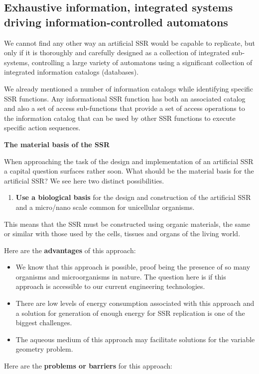 \documentclass[letterpaper]{article}
\begin{document}
\bigskip

\subsection[Exhaustive information, integrated systems driving
information{}-controlled automatons]{Exhaustive information, integrated
systems driving information-controlled automatons}
\hypertarget{RefHeading3122306210128}{}\label{bkm:Ref348984751}We cannot
find any other way an artificial SSR would be capable to replicate, but
only if it is thoroughly and carefully designed as a collection of
integrated sub-systems, controlling a large variety of automatons using
a significant collection of integrated information catalogs
(databases).


\bigskip

We already mentioned a number of information catalogs while identifying
specific SSR functions. Any informational SSR function has both an
associated catalog and also a set of access sub-functions that provide
a set of access operations to the information catalog that can be used
by other SSR functions to execute specific action sequences.


\bigskip

{\bfseries
\hypertarget{RefHeading3124306210128}{}The material basis of the SSR}

When approaching the task of the design and implementation of an
artificial SSR a capital question surfaces rather soon. What should be
the material basis for the artificial SSR? We see here two distinct
possibilities.


\bigskip

\begin{enumerate}
\item \textbf{Use a biological basis} for the design and construction of
the artificial SSR and a micro/nano scale common for unicellular
organisms. 
\end{enumerate}
This means that the SSR must be constructed using organic materials, the
same or similar with those used by the cells, tissues and organs of the
living world.

Here are the \textbf{advantages} of this approach:


\bigskip

\begin{itemize}
\item We know that this approach is possible, proof being the presence
of so many organisms and microorganisms in nature. The question here is
if this approach is accessible to our current engineering technologies.
\item There are low levels of energy consumption associated with this
approach and a solution for generation of enough energy for SSR
replication is one of the biggest challenges.
\item The aqueous medium of this approach may facilitate solutions for
the variable geometry problem.
\end{itemize}
Here are the \textbf{problems or barriers} for this approach:
\end{document}

